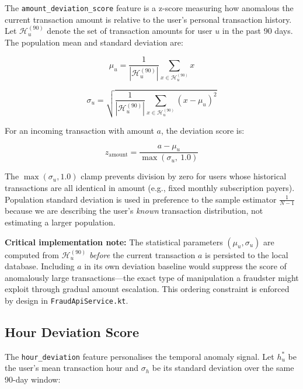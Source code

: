 \documentclass[conference]{IEEEtran}
\begin{document}
The \texttt{amount\_deviation\_score} feature is a z-score measuring how
anomalous the current transaction amount is relative to the user's personal
transaction history. Let $\mathcal{H}_u^{(90)}$ denote the set of
transaction amounts for user $u$ in the past 90 days. The population
mean and standard deviation are:

\begin{equation}
    \mu_u = \frac{1}{|\mathcal{H}_u^{(90)}|} \sum_{x \in \mathcal{H}_u^{(90)}} x
    \label{eq:mean}
\end{equation}

\begin{equation}
    \sigma_u = \sqrt{\frac{1}{|\mathcal{H}_u^{(90)}|} \sum_{x \in \mathcal{H}_u^{(90)}} (x - \mu_u)^2}
    \label{eq:stddev}
\end{equation}

For an incoming transaction with amount $a$, the deviation score is:

\begin{equation}
    z_{\text{amount}} = \frac{a - \mu_u}{\max(\sigma_u,\ 1.0)}
    \label{eq:zscore}
\end{equation}

The $\max(\sigma_u, 1.0)$ clamp prevents division by zero for users whose
historical transactions are all identical in amount (e.g., fixed monthly
subscription payers). Population standard deviation is used in preference
to the sample estimator $\frac{1}{N-1}$ because we are describing the
user's \textit{known} transaction distribution, not estimating a larger
population.

\textbf{Critical implementation note:} The statistical parameters
$(\mu_u, \sigma_u)$ are computed from $\mathcal{H}_u^{(90)}$
\textit{before} the current transaction $a$ is persisted to the local
database. Including $a$ in its own deviation baseline would suppress
the score of anomalously large transactions---the exact type of
manipulation a fraudster might exploit through gradual amount escalation.
This ordering constraint is enforced by design in \texttt{FraudApiService.kt}.

\subsection{Hour Deviation Score}

The \texttt{hour\_deviation} feature personalises the temporal anomaly
signal. Let $h_u^*$ be the user's mean transaction hour and $\sigma_h$
be its standard deviation over the same 90-day window:
\end{document}
